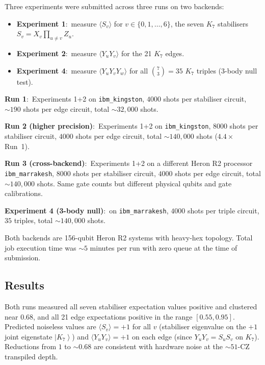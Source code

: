 \documentclass[11pt]{article}
\newcommand{\ket}[1]{\left|#1\right\rangle}
\begin{document}
Three experiments were submitted across three runs on two
backends:

\begin{itemize}
\item \textbf{Experiment 1}:\ measure $\langle S_v\rangle$ for
  $v \in \{0, 1, \ldots, 6\}$, the seven $K_7$ stabilisers
  $S_v = X_v \prod_{u \neq v} Z_u$.
\item \textbf{Experiment 2}:\ measure
  $\langle Y_u Y_v\rangle$ for the 21 $K_7$ edges.
\item \textbf{Experiment 4}:\ measure
  $\langle Y_u Y_v Y_w\rangle$ for all $\binom{7}{3} = 35$ $K_7$
  triples (3-body null test).
\end{itemize}

\noindent
\textbf{Run 1}:\ Experiments 1+2 on \texttt{ibm\_kingston},
$4000$ shots per stabiliser circuit, $\sim 190$ shots per edge
circuit, total $\sim 32{,}000$ shots.

\noindent
\textbf{Run 2 (higher precision)}:\ Experiments 1+2 on
\texttt{ibm\_kingston}, $8000$ shots per stabiliser circuit,
$4000$ shots per edge circuit, total $\sim 140{,}000$ shots
($4.4\times$ Run~1).

\noindent
\textbf{Run 3 (cross-backend)}:\ Experiments 1+2 on a different
Heron R2 processor \texttt{ibm\_marrakesh}, $8000$ shots per
stabiliser circuit, $4000$ shots per edge circuit, total
$\sim 140{,}000$ shots.  Same gate counts but different physical
qubits and gate calibrations.

\noindent
\textbf{Experiment 4 (3-body null)}:\ on \texttt{ibm\_marrakesh},
$4000$ shots per triple circuit, $35$ triples, total
$\sim 140{,}000$ shots.

\noindent
Both backends are 156-qubit Heron R2 systems with heavy-hex
topology.  Total job execution time was $\sim 5$ minutes per run
with zero queue at the time of submission.

\subsection{Results}
\label{sec:heron-results}

Both runs measured all seven stabiliser expectation values
positive and clustered near $0.68$, and all 21 edge expectations
positive in the range $[0.55, 0.95]$.  Predicted noiseless values
are $\langle S_v\rangle = +1$ for all $v$ (stabiliser eigenvalue on
the $+1$ joint eigenstate $\ket{K_7}$) and
$\langle Y_u Y_v\rangle = +1$ on each edge (since $Y_u Y_v = S_u S_v$
on $K_7$).  Reductions from $1$ to $\sim 0.68$ are consistent with
hardware noise at the $\sim 51$-CZ transpiled depth.
\end{document}
